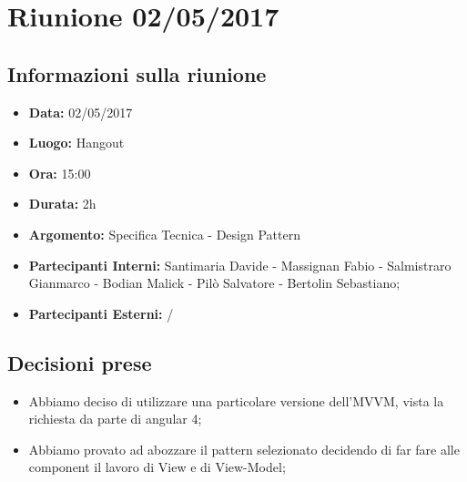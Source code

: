 \section{Riunione 02/05/2017}
  \subsection{Informazioni sulla riunione}
    \begin{itemize}
      \item \textbf{Data: }02/05/2017
      \item \textbf{Luogo: }Hangout
      \item \textbf{Ora: }15:00
      \item \textbf{Durata: }2h
      \item \textbf{Argomento: }Specifica Tecnica - Design Pattern
      \item \textbf{Partecipanti Interni: }Santimaria Davide - Massignan Fabio - Salmistraro Gianmarco - Bodian Malick - Pilò Salvatore - Bertolin Sebastiano;
      \item \textbf{Partecipanti Esterni: }/
    \end{itemize}
  \subsection{Decisioni prese}
		\begin{itemize}
			\item Abbiamo deciso di utilizzare una particolare versione dell'MVVM, vista la richiesta da parte di angular 4;
      \item Abbiamo provato ad abozzare il pattern selezionato decidendo di far fare alle component il lavoro di View e di View-Model;
		\end{itemize}
